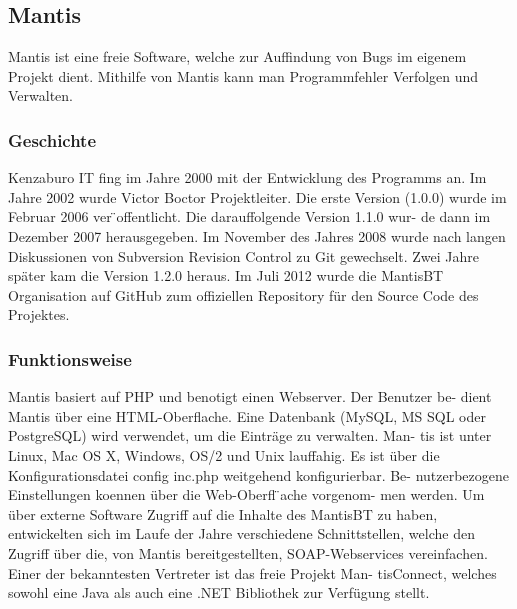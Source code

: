 \subsection{Mantis}
Mantis ist eine freie Software, welche zur Auffindung von Bugs im eigenem
Projekt dient. Mithilfe von Mantis kann man Programmfehler Verfolgen und
Verwalten.
\subsubsection{Geschichte}
Kenzaburo IT fing im Jahre 2000 mit der Entwicklung des Programms an.
Im Jahre 2002 wurde Victor Boctor Projektleiter. Die erste Version (1.0.0)
wurde im Februar 2006 ver ̈offentlicht. Die darauffolgende Version 1.1.0 wur-
de dann im Dezember 2007 herausgegeben. Im November des Jahres 2008
wurde nach langen Diskussionen von Subversion Revision Control zu Git
gewechselt. Zwei Jahre später kam die Version 1.2.0 heraus. Im Juli 2012
wurde die MantisBT Organisation auf GitHub zum offiziellen Repository
für den Source Code des Projektes.
\subsubsection{Funktionsweise}
Mantis basiert auf PHP und benotigt einen Webserver. Der Benutzer be-
dient Mantis über eine HTML-Oberflache. Eine Datenbank (MySQL, MS
SQL oder PostgreSQL) wird verwendet, um die Einträge zu verwalten. Man-
tis ist unter Linux, Mac OS X, Windows, OS/2 und Unix lauffahig. Es ist
über die Konfigurationsdatei config inc.php weitgehend konfigurierbar. Be-
nutzerbezogene Einstellungen koennen über die Web-Oberfl ̈ache vorgenom-
men werden. Um über externe Software Zugriff auf die Inhalte des MantisBT
zu haben, entwickelten sich im Laufe der Jahre verschiedene Schnittstellen,
welche den Zugriff über die, von Mantis bereitgestellten, SOAP-Webservices
vereinfachen. Einer der bekanntesten Vertreter ist das freie Projekt Man-
tisConnect, welches sowohl eine Java als auch eine .NET Bibliothek zur
Verfügung stellt.
